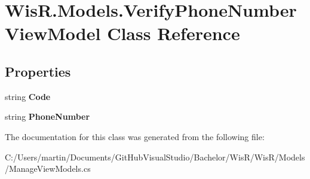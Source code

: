 \hypertarget{class_wis_r_1_1_models_1_1_verify_phone_number_view_model}{}\section{Wis\+R.\+Models.\+Verify\+Phone\+Number\+View\+Model Class Reference}
\label{class_wis_r_1_1_models_1_1_verify_phone_number_view_model}
\subsection*{Properties}
\begin{DoxyCompactItemize}
\item 
\hypertarget{class_wis_r_1_1_models_1_1_verify_phone_number_view_model_a6e957043b4c5f1e4cfd8ae2d2606dafb}{}string {\bfseries Code}\label{class_wis_r_1_1_models_1_1_verify_phone_number_view_model_a6e957043b4c5f1e4cfd8ae2d2606dafb}

\item 
\hypertarget{class_wis_r_1_1_models_1_1_verify_phone_number_view_model_acda53b3a37cf168242095c6673d9221a}{}string {\bfseries Phone\+Number}\label{class_wis_r_1_1_models_1_1_verify_phone_number_view_model_acda53b3a37cf168242095c6673d9221a}

\end{DoxyCompactItemize}


The documentation for this class was generated from the following file\+:\begin{DoxyCompactItemize}
\item 
C\+:/\+Users/martin/\+Documents/\+Git\+Hub\+Visual\+Studio/\+Bachelor/\+Wis\+R/\+Wis\+R/\+Models/Manage\+View\+Models.\+cs\end{DoxyCompactItemize}
